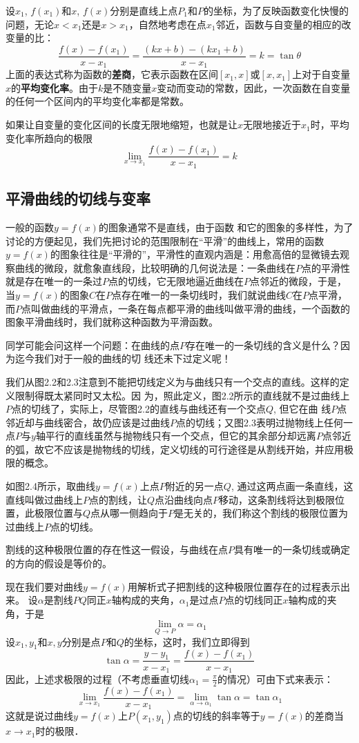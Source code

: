 设$x_1$, $f(x_1)$和$x$, $f(x)$分别是直线上点$P_1$和$P$的坐标，为了反映函数变化快慢的问题，无论$x<x_1$还是$x>x_1$，自然地考虑在点$x_1$邻近，函数与自变量的相应的改变量的比：
\[\frac{f(x)-f(x_1)}{x-x_1}=\frac{(kx+b)-(kx_1+b)}{x-x_1}=k=\tan\theta\]
上面的表达式称为函数的\textbf{差商}，它表示函数在区间$[x_1,x]$或$[x,x_1]$上对于自变量$x$的\textbf{平均变化率}。由于$k$是不随变量$x$变动而变动的常数，因此，一次函数在自变量的任何一个区间内的平均变化率都是常数。

如果让自变量的变化区间的长度无限地缩短，也就是让$x$无限地接近于$x_1$时，平均变化率所趋向的极限
\[\lim_{x\to x_1} \frac{f (x) -f (x_1)}{x-x_1} =k\]

\subsection{平滑曲线的切线与变率}
一般的函数$y=f(x)$的图象通常不是直线，由于函数
和它的图象的多样性，为了讨论的方便起见，我们先把讨论的范围限制在“平滑”的曲线上，常用的函数$y=f(x)$的图象往往是“平滑的”，平滑性的直观内涵是：用愈高倍的显微镜去观察曲线的微段，就愈象直线段，比较明确的几何说法是：一条曲线在$P$点的平滑性就是存在唯一的一条过$P$点的切线，它无限地逼近曲线在$P$点邻近的微段，于是，当$y=f(x)$的图象$C$在$P$点存在唯一的一条切线时，我们就说曲线$C$在$P$点平滑，而$P$点叫做曲线的平滑点，一条在每点都平滑的曲线叫做平滑的曲线，一个函数的图象平滑曲线时，我们就称这种函数为平滑函数。

同学可能会问这样一个问题：在曲线的点$P$存在唯一的一条切线的含义是什么？因为迄今我们对于一般的曲线的切
线还未下过定义呢！

我们从图2.2和2.3注意到不能把切线定义为与曲线只有一个交点的直线。这样的定义限制得既太紧同时又太松。因
为，照此定义，图2.2所示的直线就不是过曲线上$P$点的切线了，实际上，尽管图2.2的直线与曲线还有一个交点$Q$, 但它在曲
线$P$点邻近却与曲线密合，故仍应该是过曲线$P$点的切线；又图2.3表明过抛物线上任何一点$P$与$y$轴平行的直线虽然与抛物线只有一个交点，但它的其余部分却远离$P$点邻近的弧，故它不应该是抛物线的切线，定义切线的可行途径是从割线开始，并应用极限的概念。


如图2.4所示，取曲线$y=f(x)$上点$P$附近的另一点$Q$, 通过这两点画一条直线，这直线叫做过曲线上$P$点的割线，让$Q$点沿曲线向点$P$移动，这条割线将达到极限位置，此极限位置与$Q$点从哪一侧趋向于$P$是无关的，我们称这个割线的极限位置为过曲线上$P$点的切线。

割线的这种极限位置的存在性这一假设，与曲线在点$P$具有唯一的一条切线或确定的方向的假设是等价的。

现在我们要对曲线$y=f(x)$用解析式子把割线的这种极限位置存在的过程表示出来。
设$\alpha$是割线$PQ$同正$x$轴构成的夹角，$\alpha_1$是过点$P$点的切线同正$x$轴构成的夹角，于是
\[\lim_{Q\to P}\alpha=\alpha_1\]
设$x_1,y_1$和$x,y$分别是点$P$和$Q$的坐标，这时，我们立即得到
\[\tan\alpha=\frac{y-y_1}{x-x_1}=\frac{f(x)-f(x_1)}{x-x_1}\]
因此，上述求极限的过程（不考虑垂直切线$\alpha_1=\frac{\pi}{2}$的情况）可由下式来表示：
\[\lim_{x\to x_1}\frac{f(x)-f(x_1)}{x-x_1}=\lim_{\alpha\to \alpha_1}\tan\alpha=\tan\alpha_1\]
这就是说过曲线$y=f(x)$上$P(x_1,y_1)$点的切线的斜率等于$y=f(x)$的差商当$x\to x_1$时的极限．

